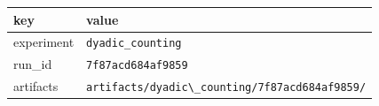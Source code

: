 \begin{tabular}{ll}%
\hline%
\textbf{key}&\textbf{value}\\%
\hline%
experiment&\texttt{dyadic\_counting}\\%
run\_id&\texttt{7f87acd684af9859}\\%
artifacts&\texttt{artifacts/dyadic\textbackslash{}\_counting/7f87acd684af9859/}\\%
\hline%
\end{tabular}
